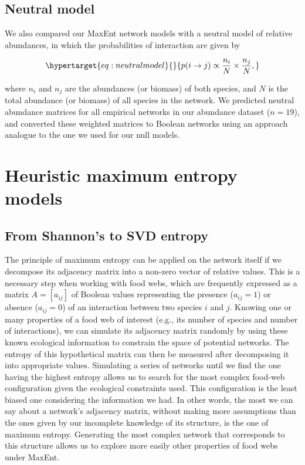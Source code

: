 \documentclass[10pt,oneside]{article}
\begin{document}
\hypertarget{neutral-model}{%
\subsection{Neutral model}\label{neutral-model}}

We also compared our MaxEnt network models with a neutral model of
relative abundances, in which the probabilities of interaction are given
by

\begin{equation}\protect\hypertarget{eq:neutralmodel}{}{p(i \rightarrow j) \propto \frac{n_i}{N} \times \frac{n_j}{N},}\label{eq:neutralmodel}\end{equation}

where \(n_i\) and \(n_j\) are the abundances (or biomass) of both
species, and \(N\) is the total abundance (or biomass) of all species in
the network. We predicted neutral abundance matrices for all empirical
networks in our abundance dataset (\(n = 19\)), and converted these
weighted matrices to Boolean networks using an approach analogue to the
one we used for our null models.

\hypertarget{heuristic-maximum-entropy-models}{%
\section{Heuristic maximum entropy
models}\label{heuristic-maximum-entropy-models}}

\hypertarget{from-shannons-to-svd-entropy}{%
\subsection{From Shannon's to SVD
entropy}\label{from-shannons-to-svd-entropy}}

The principle of maximum entropy can be applied on the network itself if
we decompose its adjacency matrix into a non-zero vector of relative
values. This is a necessary step when working with food webs, which are
frequently expressed as a matrix \(A = [a_{ij}]\) of Boolean values
representing the presence (\(a_{ij} = 1\)) or absence (\(a_{ij} = 0\))
of an interaction between two species \(i\) and \(j\). Knowing one or
many properties of a food web of interest (e.g., its number of species
and number of interactions), we can simulate its adjacency matrix
randomly by using these known ecological information to constrain the
space of potential networks. The entropy of this hypothetical matrix can
then be measured after decomposing it into appropriate values.
Simulating a series of networks until we find the one having the highest
entropy allows us to search for the most complex food-web configuration
given the ecological constraints used. This configuration is the least
biased one considering the information we had. In other words, the most
we can say about a network's adjacency matrix, without making more
assumptions than the ones given by our incomplete knowledge of its
structure, is the one of maximum entropy. Generating the most complex
network that corresponds to this structure allows us to explore more
easily other properties of food webs under MaxEnt.
\end{document}
